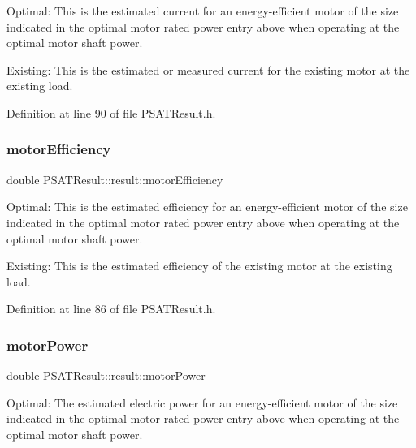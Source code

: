 Optimal\+: This is the estimated current for an energy-\/efficient motor of the size indicated in the optimal motor rated power entry above when operating at the optimal motor shaft power. 

Existing\+: This is the estimated or measured current for the existing motor at the existing load. 

Definition at line 90 of file P\+S\+A\+T\+Result.\+h.

\mbox{\label{struct_p_s_a_t_result_1_1result_a92baef08397dc269c233663deeaf6552}} 
\subsubsection{\texorpdfstring{motor\+Efficiency}{motorEfficiency}}
{\footnotesize\ttfamily double P\+S\+A\+T\+Result\+::result\+::motor\+Efficiency}



Optimal\+: This is the estimated efficiency for an energy-\/efficient motor of the size indicated in the optimal motor rated power entry above when operating at the optimal motor shaft power. 

Existing\+: This is the estimated efficiency of the existing motor at the existing load. 

Definition at line 86 of file P\+S\+A\+T\+Result.\+h.

\mbox{\label{struct_p_s_a_t_result_1_1result_aa51d5a36cf45d9ac779ae395527a81f8}} 
\subsubsection{\texorpdfstring{motor\+Power}{motorPower}}
{\footnotesize\ttfamily double P\+S\+A\+T\+Result\+::result\+::motor\+Power}



Optimal\+: The estimated electric power for an energy-\/efficient motor of the size indicated in the optimal motor rated power entry above when operating at the optimal motor shaft power. 

